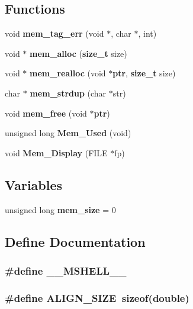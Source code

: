 \subsection*{Functions}
\begin{CompactItemize}
\item 
void {\bf mem\_\-tag\_\-err} (void $\ast$, char $\ast$, int)
\item 
void $\ast$ {\bf mem\_\-alloc} ({\bf size\_\-t} size)
\item 
void $\ast$ {\bf mem\_\-realloc} (void $\ast${\bf ptr}, {\bf size\_\-t} size)
\item 
char $\ast$ {\bf mem\_\-strdup} (char $\ast$str)
\item 
void {\bf mem\_\-free} (void $\ast${\bf ptr})
\item 
unsigned long {\bf Mem\_\-Used} (void)
\item 
void {\bf Mem\_\-Display} (FILE $\ast$fp)
\end{CompactItemize}
\subsection*{Variables}
\begin{CompactItemize}
\item 
unsigned long {\bf mem\_\-size} = 0
\end{CompactItemize}


\subsection{Define Documentation}
\subsubsection{\setlength{\rightskip}{0pt plus 5cm}\#define \_\-\_\-MSHELL\_\-\_\-}\label{mshell_8c_a0}


\subsubsection{\setlength{\rightskip}{0pt plus 5cm}\#define ALIGN\_\-SIZE\ sizeof(double)}\label{mshell_8c_a2}


